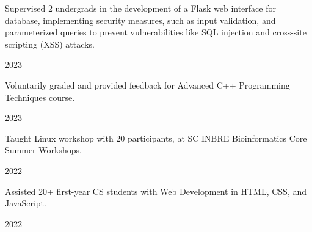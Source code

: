 
\vspace{-0.7cm}

\begin{cvleadership}
    \hspace{0cm}
    \cvled
        {
            \begin{cvitems}
                \item {Supervised 2 undergrads in the development of a Flask web interface for database, implementing security measures, such as input validation, and parameterized queries to prevent vulnerabilities like SQL injection and cross-site scripting (XSS) attacks.}
            \end{cvitems}
        }
        {}
        {2023} %
    \cvled
        {
            \begin{cvitems}
                \item {Voluntarily graded and provided feedback for Advanced C++ Programming Techniques course.}
            \end{cvitems}
        }
        {}
        {2023} %
    \cvled
        {
            \begin{cvitems}
                \item {Taught Linux workshop with 20 participants, at SC INBRE Bioinformatics Core Summer Workshops.}
            \end{cvitems}
        }
        {}
        {2022} %
    \cvled
        {
            \begin{cvitems}
                \item {Assisted 20+ first-year CS students with Web Development in HTML, CSS, and JavaScript.}
            \end{cvitems}
        }
        {}
        {2022} %
\end{cvleadership}
% 